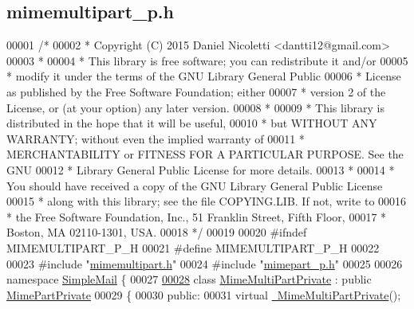 \hypertarget{mimemultipart__p_8h_source}{}\subsection{mimemultipart\+\_\+p.\+h}
\label{mimemultipart__p_8h_source}

\begin{DoxyCode}
00001 \textcolor{comment}{/*}
00002 \textcolor{comment}{ * Copyright (C) 2015 Daniel Nicoletti <dantti12@gmail.com>}
00003 \textcolor{comment}{ *}
00004 \textcolor{comment}{ * This library is free software; you can redistribute it and/or}
00005 \textcolor{comment}{ * modify it under the terms of the GNU Library General Public}
00006 \textcolor{comment}{ * License as published by the Free Software Foundation; either}
00007 \textcolor{comment}{ * version 2 of the License, or (at your option) any later version.}
00008 \textcolor{comment}{ *}
00009 \textcolor{comment}{ * This library is distributed in the hope that it will be useful,}
00010 \textcolor{comment}{ * but WITHOUT ANY WARRANTY; without even the implied warranty of}
00011 \textcolor{comment}{ *  MERCHANTABILITY or FITNESS FOR A PARTICULAR PURPOSE. See the GNU}
00012 \textcolor{comment}{ * Library General Public License for more details.}
00013 \textcolor{comment}{ *}
00014 \textcolor{comment}{ * You should have received a copy of the GNU Library General Public License}
00015 \textcolor{comment}{ * along with this library; see the file COPYING.LIB. If not, write to}
00016 \textcolor{comment}{ * the Free Software Foundation, Inc., 51 Franklin Street, Fifth Floor,}
00017 \textcolor{comment}{ * Boston, MA 02110-1301, USA.}
00018 \textcolor{comment}{ */}
00019 
00020 \textcolor{preprocessor}{#ifndef MIMEMULTIPART\_P\_H}
00021 \textcolor{preprocessor}{#define MIMEMULTIPART\_P\_H}
00022 
00023 \textcolor{preprocessor}{#include "\hyperlink{mimemultipart_8h}{mimemultipart.h}"}
00024 \textcolor{preprocessor}{#include "\hyperlink{mimepart__p_8h}{mimepart\_p.h}"}
00025 
00026 \textcolor{keyword}{namespace }\hyperlink{namespace_simple_mail}{SimpleMail} \{
00027 
\hyperlink{class_simple_mail_1_1_mime_multi_part_private}{00028} \textcolor{keyword}{class }\hyperlink{class_simple_mail_1_1_mime_multi_part_private}{MimeMultiPartPrivate} : \textcolor{keyword}{public} \hyperlink{class_simple_mail_1_1_mime_part_private}{MimePartPrivate}
00029 \{
00030 \textcolor{keyword}{public}:
00031     \textcolor{keyword}{virtual} \hyperlink{class_simple_mail_1_1_mime_multi_part_private_a08989b9ed5f0787aaa1dceb753865004}{~MimeMultiPartPrivate}();

\end{DoxyCode}

